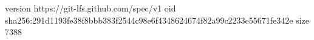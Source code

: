 version https://git-lfs.github.com/spec/v1
oid sha256:291d1193fe38f8bbb383f2544c98e6f4348624674f82a99c2233e55671fe342e
size 7388
